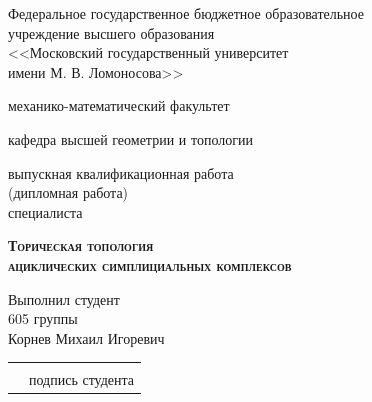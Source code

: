 \documentclass[14pt, dvipsnames, twoside]{extarticle}
\theoremstyle{definition}
\theoremstyle{remark}
\begin{document}
\renewcommand{\sectionmark}[1]{ \markboth{#1}{}} 










\thispagestyle{empty}
\begin{center}
\sc Федеральное государственное бюджетное образовательное \\
учреждение высшего образования \\
<<Московский государственный университет \\
\textnormal{имени} М. В. Ломоносова>>
\end{center}

\begin{center}
\sc механико-математический факультет
\end{center}

\begin{center}
\sc кафедра высшей геометрии и топологии
\end{center}





\hfill\break





\begin{center}
\sc выпускная квалификационная работа \\
(дипломная работа) \\
\textnormal{специалиста}
\end{center}

\begin{center}
\textsc{\textbf{Торическая топология \\ ациклических симплициальных комплексов}}
\end{center}

\hfill\break


\begin{flushright}
Выполнил студент \\
605 группы \\
Корнев Михаил Игоревич \\
\hfill\break

\begin{tabular}{@{}P{.1in}P{3in}@{}}
& \hrulefill \\
& подпись студента
\end{tabular}

\end{flushright}
\end{document}
